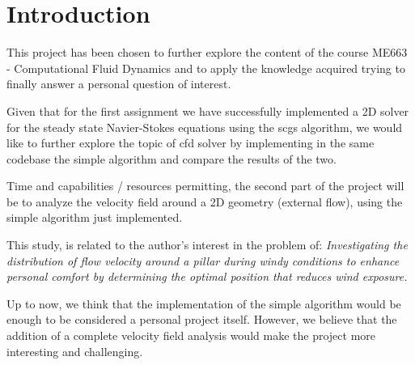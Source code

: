 \section{Introduction}

This project has been chosen to further explore the content of the course ME663 - Computational Fluid Dynamics and to apply the knowledge acquired trying to finally answer a personal question of interest.

Given that for the first assignment we have successfully implemented a 2D solver for the steady state Navier-Stokes equations using the \acrshort{scgs} algorithm, we would like to further explore the topic of \acrshort{cfd} solver by implementing in the same codebase the \acrshort{simple} algorithm and compare the results of the two.

Time and capabilities / resources permitting, the second part of the project will be to analyze the velocity field around a 2D geometry (external flow), using the \acrshort{simple} algorithm just implemented.

This study, is related to the author's interest in the problem of: \emph{Investigating the distribution of flow velocity around a pillar during windy conditions to enhance personal comfort by determining the optimal position that reduces wind exposure.}

Up to now, we think that the implementation of the \acrshort{simple} algorithm would be enough to be considered a personal project itself.
However, we believe that the addition of a complete velocity field analysis would make the project more interesting and challenging.


